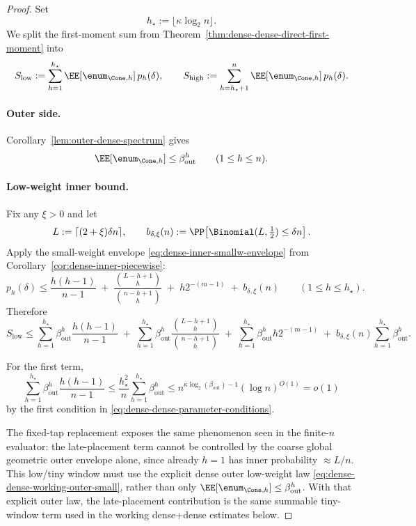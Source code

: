 \begin{proof}
Set
\[
h_\star:=\lfloor \kappa\log_2 n\rfloor.
\]
We split the first-moment sum from Theorem~\ref{thm:dense-dense-direct-first-moment} into
\[
S_{\mathrm{low}}
:=
\sum_{h=1}^{h_\star} \EE[\enum_{\Cone,h}]\,p_h(\delta),
\qquad
S_{\mathrm{high}}
:=
\sum_{h=h_\star+1}^{n} \EE[\enum_{\Cone,h}]\,p_h(\delta).
\]

\paragraph{Outer side.}
Corollary~\ref{lem:outer-dense-spectrum} gives
\[
\EE[\enum_{\Cone,h}] \le \beta_{\mathrm{out}}^h
\qquad (1\le h\le n).
\]

\paragraph{Low-weight inner bound.}
Fix any \(\xi>0\) and let
\[
L:=\lceil(2+\xi)\delta n\rceil,
\qquad
b_{\delta,\xi}(n):=
\PP\!\left[\Binomial(L,\tfrac12)\le \delta n\right].
\]
Apply the small-weight envelope \eqref{eq:dense-inner-smallw-envelope} from
Corollary~\ref{cor:dense-inner-piecewise}:
\[
p_h(\delta)
\le
\frac{h(h-1)}{n-1}
\;+\;
\frac{\binom{L-h+1}{h}}{\binom{n-h+1}{h}}
\;+\;
h2^{-(m-1)}
\;+\;
b_{\delta,\xi}(n)
\qquad (1\le h\le h_\star).
\]
Therefore
\[
S_{\mathrm{low}}
\le
\sum_{h=1}^{h_\star}\beta_{\mathrm{out}}^h\frac{h(h-1)}{n-1}
\;+\;
\sum_{h=1}^{h_\star}\beta_{\mathrm{out}}^h
\frac{\binom{L-h+1}{h}}{\binom{n-h+1}{h}}
\;+\;
\sum_{h=1}^{h_\star}\beta_{\mathrm{out}}^h h2^{-(m-1)}
\;+\;
b_{\delta,\xi}(n)\sum_{h=1}^{h_\star}\beta_{\mathrm{out}}^h.
\]

For the first term,
\[
\sum_{h=1}^{h_\star}\beta_{\mathrm{out}}^h\frac{h(h-1)}{n-1}
\le
\frac{h_\star^2}{n}\sum_{h=1}^{h_\star}\beta_{\mathrm{out}}^h
\le
n^{\kappa\log_2(\beta_{\mathrm{out}})-1}(\log n)^{O(1)}
=o(1)
\]
by the first condition in \eqref{eq:dense-dense-parameter-conditions}.

The fixed-tap replacement exposes the same phenomenon seen in the finite-\(n\) evaluator: the late-placement term
cannot be controlled by the coarse global geometric outer envelope alone, since already \(h=1\) has inner probability
\(\approx L/n\). This low/tiny window must use the explicit dense outer low-weight law
\eqref{eq:dense-dense-working-outer-small}, rather than only \(\EE[\enum_{\Cone,h}]\le\beta_{\mathrm{out}}^h\).
With that explicit outer law, the late-placement contribution is the same summable tiny-window term used in the
working dense+dense estimates below.


\end{proof}
